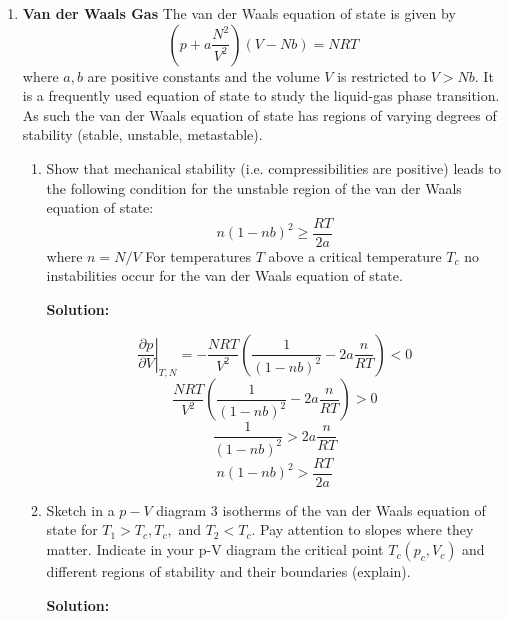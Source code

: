 \documentclass[10pt]{article}
\newenvironment{Solution}
    {\textbf{Solution:}
    
    \vspace{5mm}
    \begin{tcolorbox}
    }
    {
    \end{tcolorbox}
    \vspace{5mm}
    }
\begin{document}
\begin{enumerate}
\begin{enumerate}
\end{enumerate}

\newpage


\item \textbf{Van der Waals Gas} The van der Waals equation of state is given by
$$
\left(p+a \frac{N^{2}}{V^{2}}\right)(V-N b)=N R T
$$
where $a, b$ are positive constants and the volume $V$ is restricted to $V>N b$. It is a frequently used equation of state to study the liquid-gas phase transition. As such the van der Waals equation of state has regions of varying degrees of stability (stable, unstable, metastable).

\begin{enumerate}

\item Show that mechanical stability (i.e. compressibilities are positive) leads to the following condition for the unstable region of the van der Waals equation of state:
$$
n(1-n b)^{2} \geq \frac{R T}{2 a}
$$
where $n=N / V$
For temperatures $T$ above a critical temperature $T_{c}$ no instabilities occur for the van der Waals equation of state.

\begin{Solution}
\begin{equation}
\left.\frac{\partial p}{\partial V}\right|_{T, N}=-\frac{N R T}{V^{2}}\left(\frac{1}{(1-n b)^{2}}-2 a \frac{n}{R T}\right)< 0 
\end{equation}
\begin{equation}
\frac{N R T}{V^{2}}\left(\frac{1}{(1-n b)^{2}}-2 a \frac{n}{R T}\right)> 0 
\end{equation}
\begin{equation}
\frac{1}{(1-n b)^{2}}> 2 a \frac{n}{R T}
\end{equation}
\begin{equation}
n(1-n b)^{2} > \frac{R T}{2 a}
\end{equation}

\end{Solution}

\item Sketch in a $p-V$ diagram 3 isotherms of the van der Waals equation of state for $T_{1}>T_{c}, T_{c},$ and $T_{2}<T_{c} .$ Pay attention to slopes where they matter. Indicate in your p-V diagram the critical point $T_{c}\left(p_{c}, V_{c}\right)$ and different regions of stability and their boundaries (explain).

\begin{Solution}


\end{Solution}
\end{enumerate}
\end{enumerate}
\end{document}
